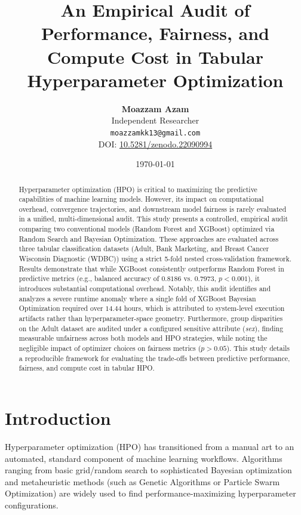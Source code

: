\documentclass[11pt,a4paper]{article}
\title{\textbf{An Empirical Audit of Performance, Fairness, and Compute Cost in Tabular Hyperparameter Optimization}}
\author{\textbf{Moazzam Azam} \\ \small Independent Researcher \\ \small \texttt{moazzamkk13@gmail.com} \\ \small DOI: \href{https://doi.org/10.5281/zenodo.22090994}{10.5281/zenodo.22090994}}
\date{\today}
\begin{document}
\maketitle

\begin{abstract}
Hyperparameter optimization (HPO) is critical to maximizing the predictive capabilities of machine learning models. However, its impact on computational overhead, convergence trajectories, and downstream model fairness is rarely evaluated in a unified, multi-dimensional audit. This study presents a controlled, empirical audit comparing two conventional models (Random Forest and XGBoost) optimized via Random Search and Bayesian Optimization. These approaches are evaluated across three tabular classification datasets (Adult, Bank Marketing, and Breast Cancer Wisconsin Diagnostic (WDBC)) using a strict 5-fold nested cross-validation framework. Results demonstrate that while XGBoost consistently outperforms Random Forest in predictive metrics (e.g., balanced accuracy of $0.8186$ vs. $0.7973$, $p < 0.001$), it introduces substantial computational overhead. Notably, this audit identifies and analyzes a severe runtime anomaly where a single fold of XGBoost Bayesian Optimization required over $14.44$ hours, which is attributed to system-level execution artifacts rather than hyperparameter-space geometry. Furthermore, group disparities on the Adult dataset are audited under a configured sensitive attribute (\textit{sex}), finding measurable unfairness across both models and HPO strategies, while noting the negligible impact of optimizer choices on fairness metrics ($p > 0.05$). This study details a reproducible framework for evaluating the trade-offs between predictive performance, fairness, and compute cost in tabular HPO.
\end{abstract}

\section{Introduction}
Hyperparameter optimization (HPO) has transitioned from a manual art to an automated, standard component of machine learning workflows. Algorithms ranging from basic grid/random search \citep{bergstra2012random} to sophisticated Bayesian optimization \citep{snoek2012practical} and metaheuristic methods (such as Genetic Algorithms or Particle Swarm Optimization) are widely used to find performance-maximizing hyperparameter configurations. 
\end{document}
